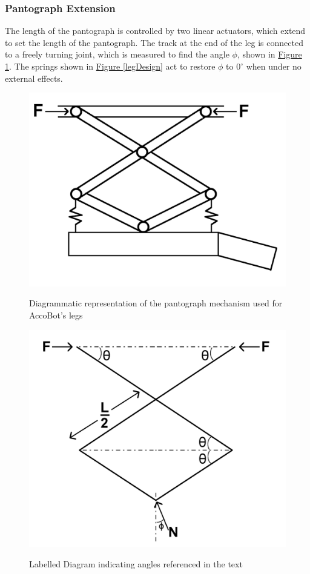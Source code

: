 \documentclass[11pt]{article}		%
\newlength{\imageheight}	 %
\newcommand{\figref}[1]{\hyperref[#1]{Figure \ref*{#1}}}    %
\begin{document}
			\subsubsection{Pantograph Extension}
			
				The length of the pantograph is controlled by two linear actuators, which extend to set the length of the pantograph.
				The track at the end of the leg is connected to a freely turning joint, which is measured to find the angle $\phi$, shown in \figref{legDiagram}.
				The springs shown in \figref{legDesign} act to restore $\phi$ to $0^\circ$ when under no external effects.
				
				\begin{figure}[h]
    				\centering
    				\begin{multicols}{2}
    					\includegraphics[height=\imageheight]{legDesign}
    					\caption{Diagrammatic representation of the pantograph mechanism used for AccoBot's legs}
    					\label{legDesign}
    					\columnbreak
    					\includegraphics[height=\imageheight]{legDiagram}
    					\caption{Labelled Diagram indicating angles referenced in the text}
    					\label{legDiagram}
    				\end{multicols}
    			\end{figure}
    			
\end{document}
